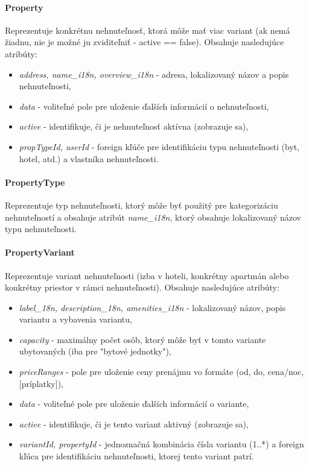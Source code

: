 \paragraph{Property} \text{ } \newline
Reprezentuje konkrétnu nehnuteľnosť, ktorá môže mať viac variant (ak nemá žiadnu, nie je možné ju zviditeľniť - active == false).
Obsahuje nasledujúce atribúty:
\begin{itemize}[itemsep=2pt]
    \item \textit{address, name\_i18n, overview\_i18n} - adresa, lokalizovaný názov a popis nehnuteľnosti,
    \item \textit{data} - voliteľné pole pre uloženie ďalších informácií o nehnuteľnosti,
    \item \textit{active} - identifikuje, či je nehnuteľnosť aktívna (zobrazuje sa),
    \item \textit{propTypeId, userId} - foreign kľúče pre identifikáciu typu nehnuteľnosti (byt, hotel, atd.) a vlastníka nehnuteľnosti.
\end{itemize}

\paragraph{PropertyType} \text{ } \newline
Reprezentuje typ nehnuteľnosti, ktorý môže byť použitý pre kategorizáciu nehnuteľností a obsahuje atribút \textit{name\_i18n}, ktorý obsahuje lokalizovaný názov typu nehnuteľnosti.

\paragraph{PropertyVariant} \text{ } \newline
Reprezentuje variant nehnuteľnosti (izba v hoteli, konkrétny apartmán alebo konkrétny priestor v rámci nehnuteľnosti).
Obsahuje nasledujúce atribúty:
\begin{itemize}[itemsep=2pt]
    \item \textit{label\_18n, description\_18n, amenities\_i18n} - lokalizovaný názov, popis variantu a vybavenia variantu,
    \item \textit{capacity} - maximálny počet osôb, ktorý môže byť v tomto variante ubytovaných (iba pre "bytové jednotky"),
    \item \textit{priceRanges} - pole pre uloženie ceny prenájmu vo formáte (od, do, cena/noc, [príplatky]),
    \item \textit{data} - voliteľné pole pre uloženie ďalších informácií o variante,
    \item \textit{active} - identifikuje, či je tento variant aktivný (zobrazuje sa),
    \item \textit{variantId, propertyId} - jednoznačná kombinácia čísla variantu (1..*) a foreign kľúca pre identifikáciu nehnuteľnosti, ktorej tento variant patrí.
\end{itemize}

